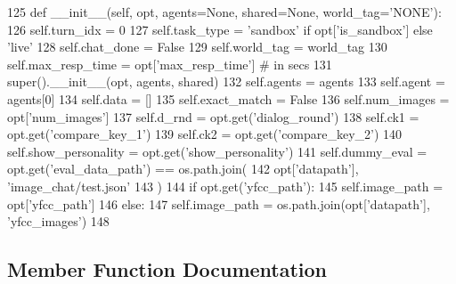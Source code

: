 \begin{DoxyCode}
125     \textcolor{keyword}{def }\_\_init\_\_(self, opt, agents=None, shared=None, world\_tag='NONE'):
126         self.turn\_idx = 0
127         self.task\_type = \textcolor{stringliteral}{'sandbox'} \textcolor{keywordflow}{if} opt[\textcolor{stringliteral}{'is\_sandbox'}] \textcolor{keywordflow}{else} \textcolor{stringliteral}{'live'}
128         self.chat\_done = \textcolor{keyword}{False}
129         self.world\_tag = world\_tag
130         self.max\_resp\_time = opt[\textcolor{stringliteral}{'max\_resp\_time'}]  \textcolor{comment}{# in secs}
131         super().\_\_init\_\_(opt, agents, shared)
132         self.agents = agents
133         self.agent = agents[0]
134         self.data = []
135         self.exact\_match = \textcolor{keyword}{False}
136         self.num\_images = opt[\textcolor{stringliteral}{'num\_images'}]
137         self.d\_rnd = opt.get(\textcolor{stringliteral}{'dialog\_round'})
138         self.ck1 = opt.get(\textcolor{stringliteral}{'compare\_key\_1'})
139         self.ck2 = opt.get(\textcolor{stringliteral}{'compare\_key\_2'})
140         self.show\_personality = opt.get(\textcolor{stringliteral}{'show\_personality'})
141         self.dummy\_eval = opt.get(\textcolor{stringliteral}{'eval\_data\_path'}) == os.path.join(
142             opt[\textcolor{stringliteral}{'datapath'}], \textcolor{stringliteral}{'image\_chat/test.json'}
143         )
144         \textcolor{keywordflow}{if} opt.get(\textcolor{stringliteral}{'yfcc\_path'}):
145             self.image\_path = opt[\textcolor{stringliteral}{'yfcc\_path'}]
146         \textcolor{keywordflow}{else}:
147             self.image\_path = os.path.join(opt[\textcolor{stringliteral}{'datapath'}], \textcolor{stringliteral}{'yfcc\_images'})
148 
\end{DoxyCode}


\subsection{Member Function Documentation}
\mbox{\label{classstack__rank__evals_1_1worlds_1_1MTurkImageChatStackRankWorld_a9c6f889227e1aec6ad1dbaa4150b1625}} 

